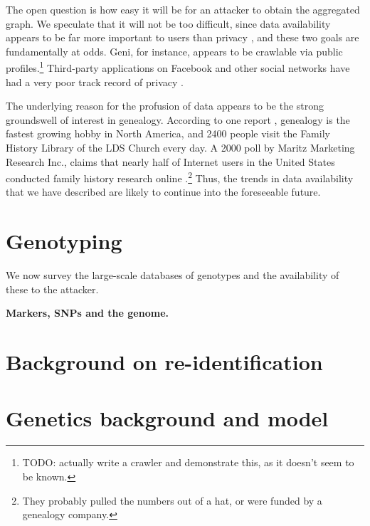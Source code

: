 \documentclass{article}
\begin{document}
The open question is how easy it will be for an attacker to obtain the aggregated graph. We speculate that it will not be too difficult, since data availability appears to be far more important to users than privacy \cite{wp-geni.com}, and these two goals are fundamentally at odds. Geni, for instance, appears to be crawlable via public profiles.\footnote{TODO: actually write a crawler and demonstrate this, as it doesn't seem to be known.}  Third-party applications on Facebook and other social networks have had a very poor track record of privacy \cite{felt-evans}.

The underlying reason for the profusion of data appears to be the strong groundswell of interest in genealogy. According to one report \cite{hobby}, genealogy is the fastest growing hobby in North America, and 2400 people visit the Family History Library of the LDS Church every day. A 2000 poll by Maritz Marketing Research Inc., claims that nearly half of Internet users in the United States conducted family history research online \cite{maritz-poll}.\footnote{They probably pulled the numbers out of a hat, or were funded by a genealogy company.} Thus, the trends in data availability that we have described are likely to continue into the foreseeable future.


\section{Genotyping}
\label{genotype-survey}
We now survey the large-scale databases of genotypes and the availability of these to the attacker. 

{\bf Markers, SNPs and the genome.} 

\section{Background on re-identification}
\label{reidentification}


\section{Genetics background and model}
\label{genetics-background}
\end{document}
